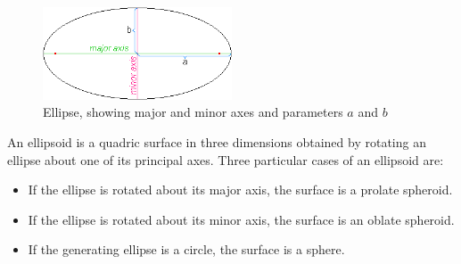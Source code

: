\begin{figure}[htb]
\begin{center}
\includegraphics[width=0.5\textwidth]{../images/form_factor/Ellipsoid/Elpsminr.png}
\end{center}
\caption{Ellipse, showing major and minor axes and parameters $a$ and $b$}
\label{minormajoraxes}
\end{figure}

An ellipsoid is a quadric surface in three dimensions obtained by
rotating an ellipse about one of its principal axes. Three
particular cases of an ellipsoid are:
\begin{itemize}
\item If the ellipse is rotated about its major axis, the surface is a prolate spheroid.
\item If the ellipse is rotated about its minor axis, the surface is an oblate spheroid.
\item If the generating ellipse is a circle, the surface is a sphere.
\end{itemize}

